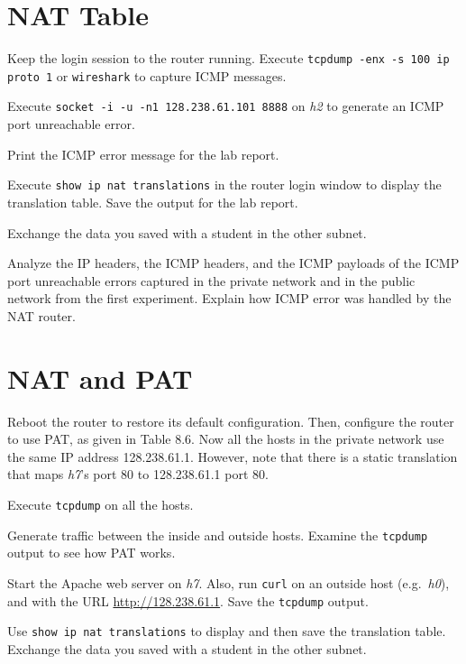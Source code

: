 \documentclass{../UTNetLab}
\begin{document}
\section{NAT Table}
    Keep the login session to the router running. Execute \lstinline{tcpdump -enx -s 100 ip proto 1} or \lstinline{wireshark} to capture ICMP messages. 

    Execute \lstinline{socket -i -u -n1 128.238.61.101 8888} on \textit{h2} to generate an ICMP port unreachable error. 

    Print the ICMP error message for the lab report. 

    Execute \lstinline[language=cisco]{show ip nat translations} in the router login window to display the translation table.
    Save the output for the lab report.

    Exchange the data you saved with a student in the other subnet.
    
    \begin{report}
    \item Analyze the IP headers, the ICMP headers, and the ICMP payloads of the ICMP port unreachable errors captured in the private network and in the public network from the first experiment.
    Explain how ICMP error was handled by the NAT router.
    \end{report}

\section{NAT and PAT}
    Reboot the router to restore its default configuration.
    Then, configure the router to use PAT, as given in Table 8.6. Now all the hosts in the private network use the same IP address 128.238.61.1. However, note that there is a static translation that maps \textit{h7}’s port 80 to 128.238.61.1 port 80. 

    Execute \lstinline{tcpdump} on all the hosts. 

    Generate traffic between the inside and outside hosts.
    Examine the \lstinline{tcpdump} output to see how PAT works.

    Start the Apache web server on \textit{h7}. Also, run \lstinline[language=bash-ext]{curl} on an outside host (e.g.\ \textit{h0}), and with the URL \url{http://128.238.61.1}. Save the \lstinline{tcpdump} output.

    Use \lstinline[language={cisco}]{show ip nat translations} to display and then save the translation table.
    Exchange the data you saved with a student in the other subnet.
\end{document}
